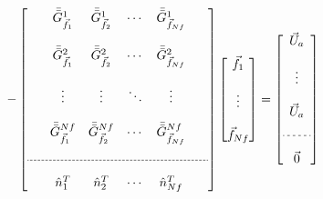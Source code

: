  \begin{align} 	%
 	-\left[
		\begin{array}{c}
		\begin{matrix}
				\phantom{,} &
 				\bar{\bar{G}}_{\vec{f}_1}^1 & 
 				\bar{\bar{G}}_{\vec{f}_2}^1 &
 				\cdots & \bar{\bar{G}}_{\vec{f}_{Nf}}^1
				 & \phantom{,}
 				\\
 				\\
				\phantom{,} &
 				\bar{\bar{G}}_{\vec{f}_1}^2 & 
 				\bar{\bar{G}}_{\vec{f}_2}^2 &
 				\cdots & \bar{\bar{G}}_{\vec{f}_{Nf}}^2
				 & \phantom{,}
 				\\ 
				\\
				\phantom{,} &
 				\vdots &  \vdots & \ddots & \vdots
				 & \phantom{,}
 				\\
 				\\
				\phantom{,} &
 				\bar{\bar{G}}_{\vec{f}_1}^{Nf} &
 				\bar{\bar{G}}_{\vec{f}_2}^{Nf} &
 				 \cdots & \bar{\bar{G}}_{\vec{f}_{Nf}}^{Nf}
				  & \phantom{,}
				  \\
 						 	\phantom{,}
			 \\
	 		\hdashline[2pt/1pt] 
			 	\\
				\phantom{,} &
			 	\hat{n}_1^T & \hat{n}_2^T & \cdots & \hat{n}_{Nf}^T
				 & \phantom{,}
			 \end{matrix}
			 \end{array}
 	\right]
 	\begin{bmatrix}
 	\vec{f}_1
 	\\ 
 	\phantom{,} 
 	\\
 	\vdots
 	\\
 	\phantom{,} 
 	\\
 	\vec{f}_{Nf}
 	\\
 	\end{bmatrix}
 	=
	\left[
	\begin{array}{c}
		\vec{U}_a \\ \\
		\vdots \\
		\\
		\vec{U}_a  \\ \\  \hdashline[2pt/2pt] \\
		 \vec{0}
	\end{array}
	\right]
	\label{eq_original_slp}
 \end{align}
